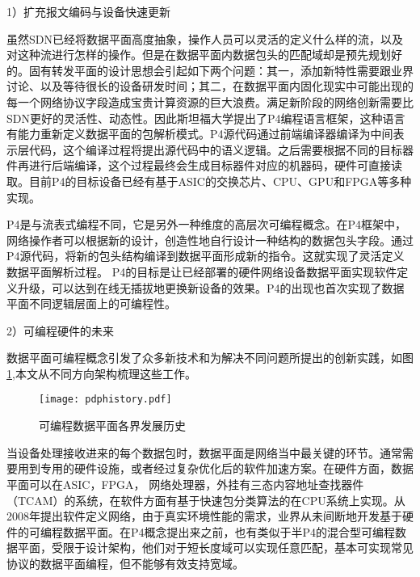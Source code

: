


1）扩充报文编码与设备快速更新

虽然SDN已经将数据平面高度抽象，操作人员可以灵活的定义什么样的流，以及对这种流进行怎样的操作。但是在数据平面内数据包头的匹配域却是预先规划好的。固有转发平面的设计思想会引起如下两个问题：其一，添加新特性需要跟业界讨论、以及等待很长的设备研发时间；其二，在数据平面内固化现实中可能出现的每一个网络协议字段造成宝贵计算资源的巨大浪费。满足新阶段的网络创新需要比SDN更好的灵活性、动态性。因此斯坦福大学提出了P4编程语言框架，这种语言有能力重新定义数据平面的包解析模式。P4源代码通过前端编译器编译为中间表示层代码，这个编译过程将提出源代码中的语义逻辑。之后需要根据不同的目标器件再进行后端编译，这个过程最终会生成目标器件对应的机器码，硬件可直接读取。目前P4的目标设备已经有基于ASIC的交换芯片、CPU、GPU和FPGA等多种实现。

P4是与流表式编程不同，它是另外一种维度的高层次可编程概念。在P4框架中，网络操作者可以根据新的设计，创造性地自行设计一种结构的数据包头字段。通过P4源代码，将新的包头结构编译到数据平面形成新的指令。这就实现了灵活定义数据平面解析过程。
P4的目标是让已经部署的硬件网络设备数据平面实现软件定义升级，可以达到在线无插拔地更换新设备的效果。P4的出现也首次实现了数据平面不同逻辑层面上的可编程性。

2）可编程硬件的未来

数据平面可编程概念引发了众多新技术和为解决不同问题所提出的创新实践，如图\ref{pdphistory},本文从不同方向架构梳理这些工作。

\begin{figure}[!ht]
	\centering
	\texttt{[image: pdphistory.pdf]}
	\caption{可编程数据平面各界发展历史} \label{pdphistory}
\end{figure}

当设备处理接收进来的每个数据包时，数据平面是网络当中最关键的环节。通常需要用到专用的硬件设施，或者经过复杂优化后的软件加速方案。在硬件方面，数据平面可以在ASIC，FPGA， 网络处理器，外挂有三态内容地址查找器件（TCAM）的系统，在软件方面有基于快速包分类算法的在CPU系统上实现。从2008年提出软件定义网络，由于真实环境性能的需求，业界从未间断地开发基于硬件的可编程数据平面。在P4概念提出来之前，也有类似于半P4的混合型可编程数据平面，受限于设计架构，他们对于短长度域可以实现任意匹配，基本可实现常见协议的数据平面编程，但不能够有效支持宽域。

